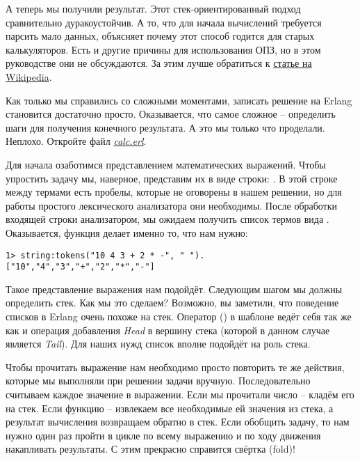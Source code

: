 А теперь мы получили результат.
Этот стек\--ориентированный подход сравнительно дуракоустойчив.
А то, что для начала вычислений требуется парсить мало данных, объясняет почему этот способ годится для старых калькуляторов.
Есть и другие причины для использования ОПЗ, но в этом руководстве они не обсуждаются.
За этим лучше обратиться к \href{http://en.wikipedia.org/wiki/Reverse_Polish_notation}{статье на Wikipedia}.

Как только мы справились со сложными моментами, записать решение на Erlang становится достаточно просто.
Оказывается, что самое сложное \--- определить шаги для получения конечного результата.
А это мы только что проделали.
Неплохо.
Откройте файл \emph{\href{http://learnyousomeerlang.com/static/erlang/calc.erl}{calc.erl}}.

Для начала озаботимся представлением математических выражений.
Чтобы упростить задачу мы, наверное, представим их в виде строки: .
В этой строке между термами есть пробелы, которые не оговорены в нашем решении, но для работы простого лексического анализатора они необходимы.
После обработки входящей строки анализатором, мы ожидаем получить список термов вида \ops{[''10'',''4'',''3'',''+'',''2'',''*'',''-'']}.
Оказывается, функция  делает именно то, что нам нужно:
\begin{lstlisting}[style=erlang]
1> string:tokens("10 4 3 + 2 * -", " ").
["10","4","3","+","2","*","-"]
\end{lstlisting}

Такое представление выражения нам подойдёт.
Следующим шагом мы должны определить стек.
Как мы это сделаем?
Возможно, вы заметили, что поведение списков в Erlang очень похоже на стек.
Оператор (\ops{|}) в шаблоне  ведёт себя так же как и операция добавления \emph{Head} в вершину стека (которой в данном случае является \emph{Tail}).
Для наших нужд список вполне подойдёт на роль стека.

Чтобы прочитать выражение нам необходимо просто повторить те же действия, которые мы выполняли при решении задачи вручную.
Последовательно считываем каждое значение в выражении.
Если мы прочитали число \--- кладём его на стек.
Если функцию \--- извлекаем все необходимые ей значения из стека, а результат вычисления возвращаем обратно в стек.
Если обобщить задачу, то нам нужно один раз пройти в цикле по всему выражению и по ходу движения накапливать результаты.
С этим прекрасно справится свёртка (fold)!

